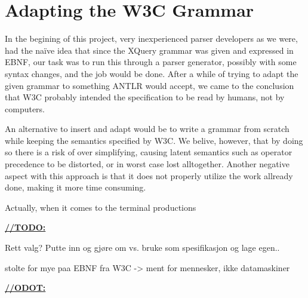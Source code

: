 \section{Adapting the W3C Grammar}
\label{sect:discussion:adaptW3C}

In the begining of this project, very inexperienced parser developers as we were, had the na\"{i}ve idea that since the XQuery grammar was given and expressed in EBNF, our task was to run this through a parser generator, possibly with some syntax changes, and the job would be done. After a while of trying to adapt the given grammar to something ANTLR would accept, we came to the conclusion that W3C probably intended the specification to be read by humans, not by computers.

An alternative to insert and adapt would be to write a grammar from scratch while keeping the semantics specified by W3C. We belive, however, that by doing so there is a risk of over simplifying, causing latent semantics such as operator precedence to be distorted, or in worst case lost alltogether. Another negative aspect with this approach is that it does not properly utilize the work allready done, making it more time consuming.

Actually, when it comes to the terminal productions

\underline{\textbf{\LARGE //TODO:}}

Rett valg? Putte inn og gj\o re om vs. bruke som spesifikasjon og lage egen..

stolte for mye paa EBNF fra W3C -> ment for mennesker, ikke datamaskiner

\underline{\textbf{\LARGE //ODOT:}}